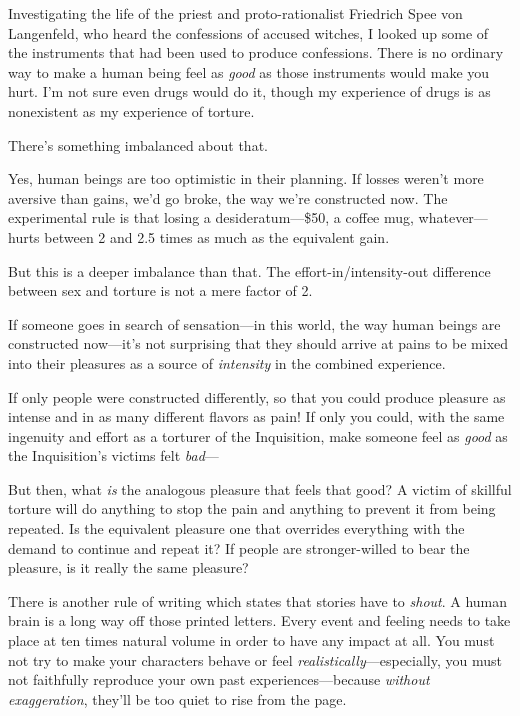 {
 Investigating the life of the priest and proto-rationalist
Friedrich Spee von Langenfeld, who heard the confessions of accused
witches, I looked up some of the instruments that had been used to
produce confessions. There is no ordinary way to make a human being
feel as \textit{good} as those instruments would make you hurt.
I'm not sure even drugs would do it, though my
experience of drugs is as nonexistent as my experience of torture.}

{
 There's something imbalanced about that.}

{
 Yes, human beings are too optimistic in their planning. If losses
weren't more aversive than gains, we'd
go broke, the way we're constructed now. The
experimental rule is that losing a desideratum---\$50, a coffee mug,
whatever---hurts between 2 and 2.5 times as much as the equivalent
gain.}

{
 But this is a deeper imbalance than that. The
effort-in/intensity-out difference between sex and torture is not a
mere factor of 2.}

{
 If someone goes in search of sensation---in this world, the way
human beings are constructed now---it's not surprising
that they should arrive at pains to be mixed into their pleasures as a
source of \textit{intensity} in the combined experience.}

{
 If only people were constructed differently, so that you could
produce pleasure as intense and in as many different flavors as pain!
If only you could, with the same ingenuity and effort as a torturer of
the Inquisition, make someone feel as \textit{good} as the
Inquisition's victims felt \textit{bad}{}---}

{
 But then, what \textit{is} the analogous pleasure that feels that
good? A victim of skillful torture will do anything to stop the pain
and anything to prevent it from being repeated. Is the equivalent
pleasure one that overrides everything with the demand to continue and
repeat it? If people are stronger-willed to bear the pleasure, is it
really the same pleasure?}

{
 There is another rule of writing which states that stories have to
\textit{shout}. A human brain is a long way off those printed letters.
Every event and feeling needs to take place at ten times natural volume
in order to have any impact at all. You must not try to make your
characters behave or feel \textit{realistically}{}---especially, you
must not faithfully reproduce your own past experiences---because
\textit{without exaggeration}, they'll be too quiet to
rise from the page.}

